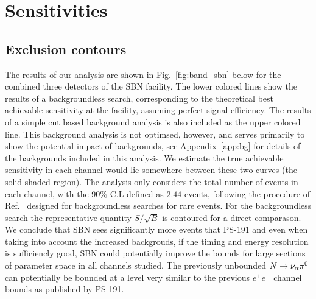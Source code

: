 \documentclass[11pt, a4paper]{article}
\newcommand{\reffig}[1]{Fig.~\ref{#1}}
\newcommand{\refapp}[1]{Appendix~\ref{#1}}
\newcommand{\refref}[1]{Ref.~\cite{#1}}
\def\ster{\ensuremath N}
\begin{document}
\section{\label{sec:sensitivities}Sensitivities}

\subsection{Exclusion contours}
%
The results of our analysis are shown in \reffig{fig:band_sbn} below for the
combined three detectors of the SBN facility. The lower colored lines show the
results of a backgroundless search, corresponding to the theoretical best
achievable sensitivity at the facility, assuming perfect signal efficiency. The
results of a simple cut based background analysis is also included as the upper
colored line. This background analysis is not optimsed, however, and serves
primarily to show the potential impact of backgrounds, see \refapp{app:bg} for details of the backgrounds included in this analysis. We
estimate the true achievable sensitivity in each channel would lie somewhere
between these two curves (the solid shaded region). The analysis only considers
the total number of events in each channel, with the 90\% C.L defined as $2.44$
events, following the procedure of \refref{Feldman:1997qc} designed for
backgroundless searches for rare events. For the backgroundless search the
representative quantity $S/\sqrt{B}$ is contoured for a direct comparason.  \\

We conclude that SBN sees significantly more events that PS-191 and even when taking into account the increased backgrouds, if the timing and energy resolution is sufficiencly good, SBN could potentially improve the bounds for large sections of parameter space in all
channels studied. The previously unbounded $\ster \rightarrow \nu_\alpha \pi^0$ can potentially be bounded at a level very similar to the previous $e^+ e^-$ channel bounds as published by PS-191.  
\end{document}
